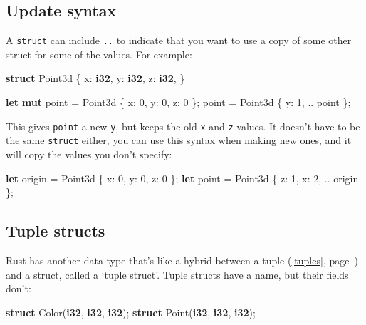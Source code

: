 \documentclass[a4paper,]{book}
\renewcommand*{\hyperref}[2][\ar]{%
  \def\ar{#2}%
  #2 (\autoref{#1}, page~\pageref{#1})}
\newenvironment{Shaded}{\begin{snugshade}}{\end{snugshade}}
\newcommand{\KeywordTok}[1]{\textcolor[rgb]{0.13,0.29,0.53}{\textbf{{#1}}}}
\newcommand{\DecValTok}[1]{\textcolor[rgb]{0.00,0.00,0.81}{{#1}}}
\newcommand{\NormalTok}[1]{{#1}}
\begin{document}
\subsection{Update syntax}\label{update-syntax}

A \texttt{struct} can include \texttt{..} to indicate that you want to
use a copy of some other struct for some of the values. For example:

\begin{Shaded}
\begin{Highlighting}[]
\KeywordTok{struct} \NormalTok{Point3d \{}
    \NormalTok{x: }\KeywordTok{i32}\NormalTok{,}
    \NormalTok{y: }\KeywordTok{i32}\NormalTok{,}
    \NormalTok{z: }\KeywordTok{i32}\NormalTok{,}
\NormalTok{\}}

\KeywordTok{let} \KeywordTok{mut} \NormalTok{point = Point3d \{ x: }\DecValTok{0}\NormalTok{, y: }\DecValTok{0}\NormalTok{, z: }\DecValTok{0} \NormalTok{\};}
\NormalTok{point = Point3d \{ y: }\DecValTok{1}\NormalTok{, .. point \};}
\end{Highlighting}
\end{Shaded}

This gives \texttt{point} a new \texttt{y}, but keeps the old \texttt{x}
and \texttt{z} values. It doesn't have to be the same \texttt{struct}
either, you can use this syntax when making new ones, and it will copy
the values you don't specify:

\begin{Shaded}
\begin{Highlighting}[]
\KeywordTok{let} \NormalTok{origin = Point3d \{ x: }\DecValTok{0}\NormalTok{, y: }\DecValTok{0}\NormalTok{, z: }\DecValTok{0} \NormalTok{\};}
\KeywordTok{let} \NormalTok{point = Point3d \{ z: }\DecValTok{1}\NormalTok{, x: }\DecValTok{2}\NormalTok{, .. origin \};}
\end{Highlighting}
\end{Shaded}

\subsection{Tuple structs}\label{tuple-structs}

Rust has another data type that's like a hybrid between a
\hyperref[tuples]{tuple} and a struct, called a `tuple struct'. Tuple
structs have a name, but their fields don't:

\begin{Shaded}
\begin{Highlighting}[]
\KeywordTok{struct} \NormalTok{Color(}\KeywordTok{i32}\NormalTok{, }\KeywordTok{i32}\NormalTok{, }\KeywordTok{i32}\NormalTok{);}
\KeywordTok{struct} \NormalTok{Point(}\KeywordTok{i32}\NormalTok{, }\KeywordTok{i32}\NormalTok{, }\KeywordTok{i32}\NormalTok{);}
\end{Highlighting}
\end{Shaded}
\end{document}
